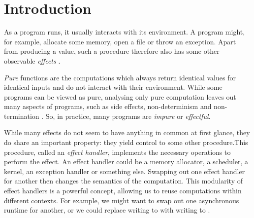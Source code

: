 \chapter{Introduction}\label{chap:introduction}


As a program runs, it usually interacts with its environment. A program might, for example, allocate some memory, open a file or throw an exception. Apart from producing a value, such a procedure therefore also has some other observable \emph{effects} \autocite{moggi_computational_1989}.

\emph{Pure} functions are the computations which always return identical values for identical inputs and do not interact with their environment. While some programs can be viewed as pure, analysing only pure computation leaves out many aspects of programs, such as side effects, non-determinism and non-termination \autocite{moggi_computational_1989}. So, in practice, many programs are \emph{impure} or \emph{effectful}.


While many effects do not seem to have anything in common at first glance, they do share an important property: they yield control to some other procedure.\citationneeded This procedure, called an \emph{effect handler}, implements the necessary operations to perform the effect. An effect handler could be a memory allocator, a scheduler, a kernel, an exception handler or something else. Swapping out one effect handler for another then changes the semantics of the computation. This modularity of effect handlers is a powerful concept, allowing us to reuse computations within different contexts. For example, we might want to swap out one asynchronous runtime for another, or we could replace writing to  with writing to .

